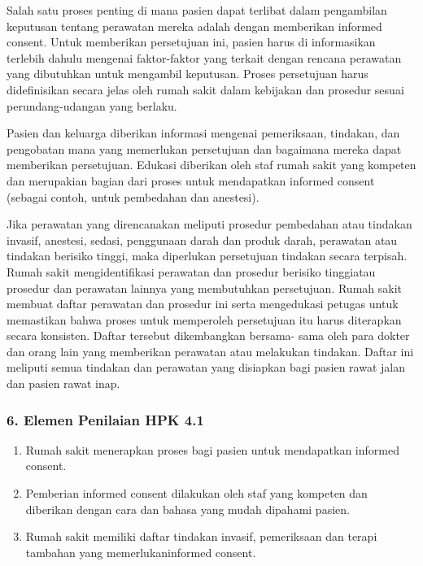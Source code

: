 \documentclass[
]{book}
\providecommand{\tightlist}{%
  \setlength{\itemsep}{0pt}\setlength{\parskip}{0pt}}
\begin{document}
Salah satu proses penting di mana pasien dapat terlibat dalam pengambilan keputusan tentang perawatan mereka adalah dengan memberikan informed consent. Untuk memberikan persetujuan ini, pasien harus di informasikan terlebih dahulu mengenai faktor-faktor yang terkait dengan rencana perawatan yang dibutuhkan untuk mengambil keputusan. Proses persetujuan harus didefinisikan secara jelas oleh rumah sakit dalam kebijakan dan prosedur sesuai perundang-udangan yang berlaku.

Pasien dan keluarga diberikan informasi mengenai pemeriksaan, tindakan, dan pengobatan mana yang memerlukan persetujuan dan bagaimana mereka dapat memberikan persetujuan. Edukasi diberikan oleh staf rumah sakit yang kompeten dan merupakian bagian dari proses untuk mendapatkan informed consent (sebagai contoh, untuk pembedahan dan anestesi).

Jika perawatan yang direncanakan meliputi prosedur pembedahan atau tindakan invasif, anestesi, sedasi, penggunaan darah dan produk darah, perawatan atau tindakan berisiko tinggi, maka diperlukan persetujuan tindakan secara terpisah. Rumah sakit mengidentifikasi perawatan dan prosedur berisiko tinggiatau prosedur dan perawatan lainnya yang membutuhkan persetujuan. Rumah sakit membuat daftar perawatan dan prosedur ini serta mengedukasi petugas untuk memastikan bahwa proses untuk memperoleh persetujuan itu harus diterapkan secara konsisten. Daftar tersebut dikembangkan bersama- sama oleh para dokter dan orang lain yang memberikan perawatan atau melakukan tindakan. Daftar ini meliputi semua tindakan dan perawatan yang disiapkan bagi pasien rawat jalan dan pasien rawat inap.

\hypertarget{elemen-penilaian-hpk-4.1}{%
\subsubsection*{6. Elemen Penilaian HPK 4.1}\label{elemen-penilaian-hpk-4.1}}

\begin{enumerate}
\def\labelenumi{\alph{enumi}.}
\tightlist
\item
  Rumah sakit menerapkan proses bagi pasien untuk mendapatkan informed consent.
\item
  Pemberian informed consent dilakukan oleh staf yang kompeten dan diberikan dengan cara dan bahasa yang mudah dipahami pasien.
\item
  Rumah sakit memiliki daftar tindakan invasif, pemeriksaan dan terapi tambahan yang memerlukaninformed consent.
\end{enumerate}
\end{document}
